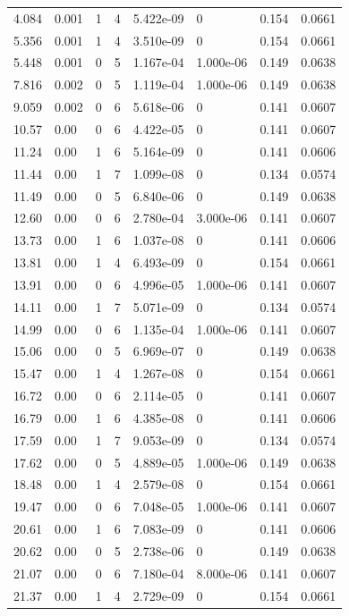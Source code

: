 \documentclass[preview]{standalone}
\begin{document}
{{\begin{tabular}{L{1.2cm}C{1.2cm} C{0.3cm}C{0.5cm} C{1.4cm}C{1.4cm} C{1.4cm}C{1.4cm}}
  4.084  &  0.001  & 1     &  4 &  5.422e-09  & 0  & 0.154 &  0.0661   \\ 
  5.356  &  0.001  & 1     &  4 &  3.510e-09  & 0  & 0.154 &  0.0661   \\ 
  5.448  &  0.001  & 0     &  5 &  1.167e-04  & 1.000e-06  & 0.149 &  0.0638   \\ 
  7.816  &  0.002  & 0     &  5 &  1.119e-04  & 1.000e-06  & 0.149 &  0.0638   \\ 
  9.059  &  0.002  & 0     &  6 &  5.618e-06  & 0  & 0.141 &  0.0607   \\ 
  10.57  &  0.00  & 0     &  6 &  4.422e-05  & 0  & 0.141 &  0.0607   \\ 
  11.24  &  0.00  & 1     &  6 &  5.164e-09  & 0  & 0.141 &  0.0606   \\ 
  11.44  &  0.00  & 1     &  7 &  1.099e-08  & 0  & 0.134 &  0.0574   \\ 
  11.49  &  0.00  & 0     &  5 &  6.840e-06  & 0  & 0.149 &  0.0638   \\ 
  12.60  &  0.00  & 0     &  6 &  2.780e-04  & 3.000e-06  & 0.141 &  0.0607   \\ 
  13.73  &  0.00  & 1     &  6 &  1.037e-08  & 0  & 0.141 &  0.0606   \\ 
  13.81  &  0.00  & 1     &  4 &  6.493e-09  & 0  & 0.154 &  0.0661   \\ 
  13.91  &  0.00  & 0     &  6 &  4.996e-05  & 1.000e-06  & 0.141 &  0.0607   \\ 
  14.11  &  0.00  & 1     &  7 &  5.071e-09  & 0  & 0.134 &  0.0574   \\ 
  14.99  &  0.00  & 0     &  6 &  1.135e-04  & 1.000e-06  & 0.141 &  0.0607   \\ 
  15.06  &  0.00  & 0     &  5 &  6.969e-07  & 0  & 0.149 &  0.0638   \\ 
  15.47  &  0.00  & 1     &  4 &  1.267e-08  & 0  & 0.154 &  0.0661   \\ 
  16.72  &  0.00  & 0     &  6 &  2.114e-05  & 0  & 0.141 &  0.0607   \\ 
  16.79  &  0.00  & 1     &  6 &  4.385e-08  & 0  & 0.141 &  0.0606   \\ 
  17.59  &  0.00  & 1     &  7 &  9.053e-09  & 0  & 0.134 &  0.0574   \\ 
  17.62  &  0.00  & 0     &  5 &  4.889e-05  & 1.000e-06  & 0.149 &  0.0638   \\ 
  18.48  &  0.00  & 1     &  4 &  2.579e-08  & 0  & 0.154 &  0.0661   \\ 
  19.47  &  0.00  & 0     &  6 &  7.048e-05  & 1.000e-06  & 0.141 &  0.0607   \\ 
  20.61  &  0.00  & 1     &  6 &  7.083e-09  & 0  & 0.141 &  0.0606   \\ 
  20.62  &  0.00  & 0     &  5 &  2.738e-06  & 0  & 0.149 &  0.0638   \\ 
  21.07  &  0.00  & 0     &  6 &  7.180e-04  & 8.000e-06  & 0.141 &  0.0607   \\ 
  21.37  &  0.00  & 1     &  4 &  2.729e-09  & 0  & 0.154 &  0.0661   \\ 
\hline 
\end{tabular} 

}}
\end{document}
